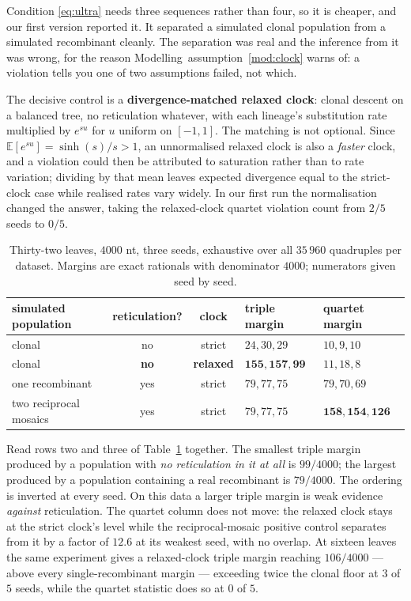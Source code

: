 \documentclass[11pt,a4paper]{article}
\theoremstyle{definition}
\theoremstyle{remark}
\begin{document}
Condition \eqref{eq:ultra} needs three sequences rather than four, so it is
cheaper, and our first version reported it. It separated a simulated clonal
population from a simulated recombinant cleanly. The separation was real and the
inference from it was wrong, for the reason
Modelling~assumption~\ref{mod:clock} warns of: a violation tells you one of two
assumptions failed, not which.

The decisive control is a \textbf{divergence-matched relaxed clock}: clonal
descent on a balanced tree, no reticulation whatever, with each lineage's
substitution rate multiplied by $e^{su}$ for $u$ uniform on $[-1,1]$. The
matching is not optional. Since $\mathbb{E}[e^{su}] = \sinh(s)/s > 1$, an
unnormalised relaxed clock is also a \emph{faster} clock, and a violation could
then be attributed to saturation rather than to rate variation; dividing by that
mean leaves expected divergence equal to the strict-clock case while realised
rates vary widely. In our first run the normalisation changed the answer, taking
the relaxed-clock quartet violation count from $2/5$ seeds to $0/5$.

\begin{table}[t]
\centering\small
\caption{Thirty-two leaves, $4000$ nt, three seeds, exhaustive over all
$35\,960$ quadruples per dataset. Margins are exact rationals with denominator
$4000$; numerators given seed by seed.}
\label{tab:refute}
\begin{tabular}{@{}lccll@{}}
\toprule
simulated population & reticulation? & clock & triple margin & quartet margin \\
\midrule
clonal                     & no  & strict  & $24, 30, 29$   & $10, 9, 10$ \\
clonal                     & \textbf{no}  & \textbf{relaxed} & $\mathbf{155, 157, 99}$ & $11, 18, 8$ \\
one recombinant            & yes & strict  & $79, 77, 75$   & $79, 70, 69$ \\
two reciprocal mosaics     & yes & strict  & $79, 77, 75$   & $\mathbf{158, 154, 126}$ \\
\bottomrule
\end{tabular}
\end{table}

Read rows two and three of Table~\ref{tab:refute} together. The smallest triple
margin produced by a population with \emph{no reticulation in it at all} is
$99/4000$; the largest produced by a population containing a real recombinant is
$79/4000$. The ordering is inverted at every seed. On this data a larger triple
margin is weak evidence \emph{against} reticulation. The quartet column does not
move: the relaxed clock stays at the strict clock's level while the
reciprocal-mosaic positive control separates from it by a factor of $12.6$ at its
weakest seed, with no overlap. At sixteen leaves the same experiment gives a
relaxed-clock triple margin reaching $106/4000$ --- above every
single-recombinant margin --- exceeding twice the clonal floor at $3$ of $5$
seeds, while the quartet statistic does so at $0$ of $5$.
\end{document}
